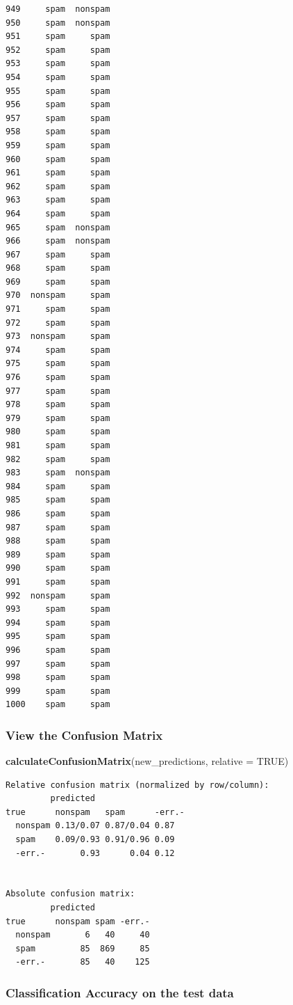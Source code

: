 \documentclass[
]{article}
\newenvironment{Shaded}{\begin{snugshade}}{\end{snugshade}}
\newcommand{\AttributeTok}[1]{\textcolor[rgb]{0.13,0.29,0.53}{#1}}
\newcommand{\ConstantTok}[1]{\textcolor[rgb]{0.56,0.35,0.01}{#1}}
\newcommand{\FunctionTok}[1]{\textcolor[rgb]{0.13,0.29,0.53}{\textbf{#1}}}
\newcommand{\NormalTok}[1]{#1}
\begin{document}
\begin{verbatim}
949     spam  nonspam
950     spam  nonspam
951     spam     spam
952     spam     spam
953     spam     spam
954     spam     spam
955     spam     spam
956     spam     spam
957     spam     spam
958     spam     spam
959     spam     spam
960     spam     spam
961     spam     spam
962     spam     spam
963     spam     spam
964     spam     spam
965     spam  nonspam
966     spam  nonspam
967     spam     spam
968     spam     spam
969     spam     spam
970  nonspam     spam
971     spam     spam
972     spam     spam
973  nonspam     spam
974     spam     spam
975     spam     spam
976     spam     spam
977     spam     spam
978     spam     spam
979     spam     spam
980     spam     spam
981     spam     spam
982     spam     spam
983     spam  nonspam
984     spam     spam
985     spam     spam
986     spam     spam
987     spam     spam
988     spam     spam
989     spam     spam
990     spam     spam
991     spam     spam
992  nonspam     spam
993     spam     spam
994     spam     spam
995     spam     spam
996     spam     spam
997     spam     spam
998     spam     spam
999     spam     spam
1000    spam     spam
\end{verbatim}

\subsubsection{View the Confusion
Matrix}\label{view-the-confusion-matrix}

\begin{Shaded}
\begin{Highlighting}[]
\FunctionTok{calculateConfusionMatrix}\NormalTok{(new\_predictions, }\AttributeTok{relative =} \ConstantTok{TRUE}\NormalTok{)}
\end{Highlighting}
\end{Shaded}

\begin{verbatim}
Relative confusion matrix (normalized by row/column):
         predicted
true      nonspam   spam      -err.-   
  nonspam 0.13/0.07 0.87/0.04 0.87     
  spam    0.09/0.93 0.91/0.96 0.09     
  -err.-       0.93      0.04 0.12     


Absolute confusion matrix:
         predicted
true      nonspam spam -err.-
  nonspam       6   40     40
  spam         85  869     85
  -err.-       85   40    125
\end{verbatim}

\subsubsection{Classification Accuracy on the test
data}\label{classification-accuracy-on-the-test-data}
\end{document}
